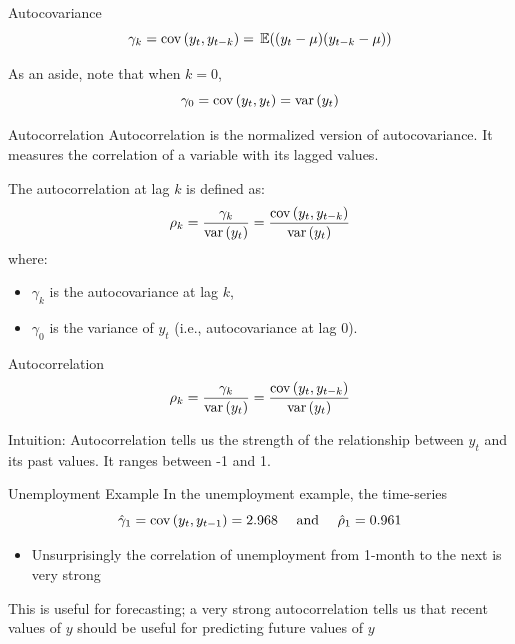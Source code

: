 \documentclass[aspectratio=169,t,11pt,table]{beamer}
\begin{document}
\begin{frame}{Autocovariance}
  \vspace*{-\bigskipamount}
  $$
    \gamma_k = \cov{y_t, y_{t-k}} = \expec{(y_t - \mu)(y_{t-k} - \mu)}
  $$

  \bigskip
  As an aside, note that when $k = 0$, 
  $$
    \gamma_0 = \cov{y_t, y_t} = \var{y_t}
  $$
\end{frame}

\begin{frame}{Autocorrelation}
  \alert{Autocorrelation} is the normalized version of autocovariance. It measures the correlation of a variable with its lagged values.

  \bigskip
  The autocorrelation at lag $k$ is defined as:
  $$
    \rho_k = \frac{\gamma_k}{\var{y_t}} = \frac{\cov{y_t, y_{t-k}}}{\var{y_t}}
  $$
  where:
  \begin{itemize}
    \item $\gamma_k$ is the autocovariance at lag $k$,
    \item $\gamma_0$ is the variance of $y_t$ (i.e., autocovariance at lag 0).
  \end{itemize}
\end{frame}

\begin{frame}{Autocorrelation}
  \vspace*{-\bigskipamount}
  $$
    \rho_k = \frac{\gamma_k}{\var{y_t}} = \frac{\cov{y_t, y_{t-k}}}{\var{y_t}}
  $$
  
  \bigskip
  \alert{Intuition}: Autocorrelation tells us the strength of the relationship between $y_t$ and its past values. It ranges between -1 and 1.
\end{frame}


\begin{frame}{Unemployment Example}
  In the unemployment example, the time-series 
  $$
    \hat{\gamma}_1 = \cov{y_t, y_{t-1}} = 2.968 \quad \text{ and } \quad \hat{\rho}_1 = 0.961
  $$
  \begin{itemize}
    \item Unsurprisingly the correlation of unemployment from 1-month to the next is very strong
  \end{itemize}

  \pause
  \bigskip
  This is useful for forecasting; a very strong autocorrelation tells us that recent values of $y$ should be useful for predicting future values of $y$
\end{frame}
\end{document}
